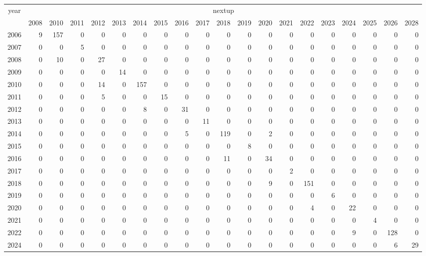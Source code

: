 \footnotesize\begin{tabular}[t]{lrrrrrrrrrrrrrrrrrrr}
\toprule
\multicolumn{1}{c}{year} & \multicolumn{19}{c}{nextup} \\
\cmidrule(l{3pt}r{3pt}){1-1} \cmidrule(l{3pt}r{3pt}){2-20}
  & 2008 & 2010 & 2011 & 2012 & 2013 & 2014 & 2015 & 2016 & 2017 & 2018 & 2019 & 2020 & 2021 & 2022 & 2023 & 2024 & 2025 & 2026 & 2028\\
\midrule
2006 & 9 & 157 & 0 & 0 & 0 & 0 & 0 & 0 & 0 & 0 & 0 & 0 & 0 & 0 & 0 & 0 & 0 & 0 & 0\\
2007 & 0 & 0 & 5 & 0 & 0 & 0 & 0 & 0 & 0 & 0 & 0 & 0 & 0 & 0 & 0 & 0 & 0 & 0 & 0\\
2008 & 0 & 10 & 0 & 27 & 0 & 0 & 0 & 0 & 0 & 0 & 0 & 0 & 0 & 0 & 0 & 0 & 0 & 0 & 0\\
2009 & 0 & 0 & 0 & 0 & 14 & 0 & 0 & 0 & 0 & 0 & 0 & 0 & 0 & 0 & 0 & 0 & 0 & 0 & 0\\
2010 & 0 & 0 & 0 & 14 & 0 & 157 & 0 & 0 & 0 & 0 & 0 & 0 & 0 & 0 & 0 & 0 & 0 & 0 & 0\\
2011 & 0 & 0 & 0 & 5 & 0 & 0 & 15 & 0 & 0 & 0 & 0 & 0 & 0 & 0 & 0 & 0 & 0 & 0 & 0\\
2012 & 0 & 0 & 0 & 0 & 0 & 8 & 0 & 31 & 0 & 0 & 0 & 0 & 0 & 0 & 0 & 0 & 0 & 0 & 0\\
2013 & 0 & 0 & 0 & 0 & 0 & 0 & 0 & 0 & 11 & 0 & 0 & 0 & 0 & 0 & 0 & 0 & 0 & 0 & 0\\
2014 & 0 & 0 & 0 & 0 & 0 & 0 & 0 & 5 & 0 & 119 & 0 & 2 & 0 & 0 & 0 & 0 & 0 & 0 & 0\\
2015 & 0 & 0 & 0 & 0 & 0 & 0 & 0 & 0 & 0 & 0 & 8 & 0 & 0 & 0 & 0 & 0 & 0 & 0 & 0\\
2016 & 0 & 0 & 0 & 0 & 0 & 0 & 0 & 0 & 0 & 11 & 0 & 34 & 0 & 0 & 0 & 0 & 0 & 0 & 0\\
2017 & 0 & 0 & 0 & 0 & 0 & 0 & 0 & 0 & 0 & 0 & 0 & 0 & 2 & 0 & 0 & 0 & 0 & 0 & 0\\
2018 & 0 & 0 & 0 & 0 & 0 & 0 & 0 & 0 & 0 & 0 & 0 & 9 & 0 & 151 & 0 & 0 & 0 & 0 & 0\\
2019 & 0 & 0 & 0 & 0 & 0 & 0 & 0 & 0 & 0 & 0 & 0 & 0 & 0 & 0 & 6 & 0 & 0 & 0 & 0\\
2020 & 0 & 0 & 0 & 0 & 0 & 0 & 0 & 0 & 0 & 0 & 0 & 0 & 0 & 4 & 0 & 22 & 0 & 0 & 0\\
2021 & 0 & 0 & 0 & 0 & 0 & 0 & 0 & 0 & 0 & 0 & 0 & 0 & 0 & 0 & 0 & 0 & 4 & 0 & 0\\
2022 & 0 & 0 & 0 & 0 & 0 & 0 & 0 & 0 & 0 & 0 & 0 & 0 & 0 & 0 & 0 & 9 & 0 & 128 & 0\\
2024 & 0 & 0 & 0 & 0 & 0 & 0 & 0 & 0 & 0 & 0 & 0 & 0 & 0 & 0 & 0 & 0 & 0 & 6 & 29\\
\bottomrule
\end{tabular}
